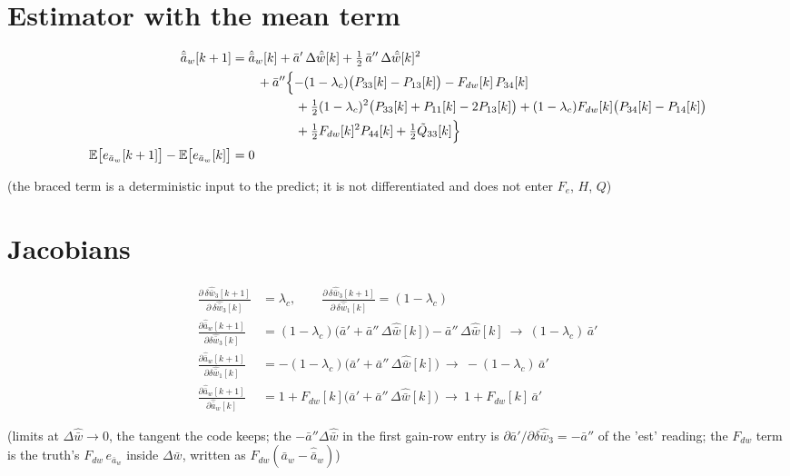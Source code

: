 \documentclass[11pt,a4paper,fontset=none]{ctexart}
\newcommand{\ba}{\bar{a}}
\newcommand{\bw}{\bar{w}}
\newcommand{\E}{\mathbb{E}}
\newcommand{\dW}{\Delta\bw}
\newcommand{\dWh}{\Delta\hat{\bw}}
\newcommand{\ap}{\ba'}
\newcommand{\app}{\ba''}
\begin{document}
\section{Estimator with the mean term}

\begin{align*}
\hat{\ba}_w[k+1] &= \hat{\ba}_w[k] + \ap\,\dWh[k] + \tfrac{1}{2}\,\app\,\dWh[k]^{2} \\
  &\qquad + \app\Bigl\{-(1-\lambda_c)\bigl(P_{33}[k] - P_{13}[k]\bigr) - F_{dw}[k]\,P_{34}[k] \\
  &\qquad\qquad\quad + \tfrac{1}{2}(1-\lambda_c)^{2}\bigl(P_{33}[k] + P_{11}[k] - 2P_{13}[k]\bigr)
     + (1-\lambda_c)F_{dw}[k]\bigl(P_{34}[k] - P_{14}[k]\bigr) \\
  &\qquad\qquad\quad + \tfrac{1}{2}F_{dw}[k]^{2}P_{44}[k] + \tfrac{1}{2}\tilde{Q}_{33}[k]\Bigr\} \\
\E\bigl[e_{\ba_w}[k+1]\bigr] - \E\bigl[e_{\ba_w}[k]\bigr] &= 0
\end{align*}

(the braced term is a deterministic input to the predict; it is not differentiated and does not enter $F_e$, $H$, $Q$)

\section{Jacobians}

\begin{align*}
\frac{\partial\,\delta\hat{\bw}_3[k+1]}{\partial\,\delta\hat{\bw}_3[k]} &= \lambda_c , \qquad
\frac{\partial\,\delta\hat{\bw}_3[k+1]}{\partial\,\delta\hat{\bw}_1[k]} = (1-\lambda_c) \\
\frac{\partial \hat{\ba}_w[k+1]}{\partial \delta\hat{\bw}_3[k]}
  &= (1-\lambda_c)\bigl(\ap + \app\,\dWh[k]\bigr) - \app\,\dWh[k]
  \ \to\ (1-\lambda_c)\,\ap \\
\frac{\partial \hat{\ba}_w[k+1]}{\partial \delta\hat{\bw}_1[k]}
  &= -(1-\lambda_c)\bigl(\ap + \app\,\dWh[k]\bigr)
  \ \to\ -(1-\lambda_c)\,\ap \\
\frac{\partial \hat{\ba}_w[k+1]}{\partial \hat{\ba}_w[k]}
  &= 1 + F_{dw}[k]\bigl(\ap + \app\,\dWh[k]\bigr)
  \ \to\ 1 + F_{dw}[k]\,\ap
\end{align*}

(limits at $\dWh \to 0$, the tangent the code keeps; the $-\app\dWh$ in the first gain-row entry is $\partial\ap/\partial\delta\hat{\bw}_3 = -\app$ of the 'est' reading;
the $F_{dw}$ term is the truth's $F_{dw}\,e_{\ba_w}$ inside $\dW$, written as $F_{dw}(\ba_w - \hat{\ba}_w)$)
\end{document}
